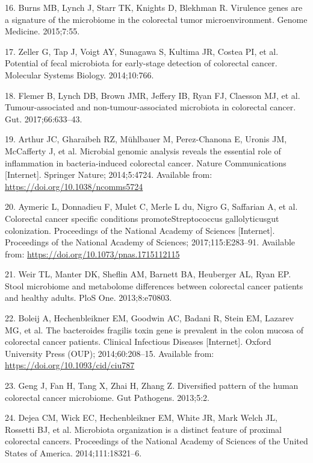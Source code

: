 \documentclass[12pt,]{article}
\begin{document}
\hypertarget{ref-burns_virulence_2015}{}
16. Burns MB, Lynch J, Starr TK, Knights D, Blekhman R. Virulence genes
are a signature of the microbiome in the colorectal tumor
microenvironment. Genome Medicine. 2015;7:55.

\hypertarget{ref-zeller_potential_2014}{}
17. Zeller G, Tap J, Voigt AY, Sunagawa S, Kultima JR, Costea PI, et al.
Potential of fecal microbiota for early-stage detection of colorectal
cancer. Molecular Systems Biology. 2014;10:766.

\hypertarget{ref-flemer_tumour-associated_2017}{}
18. Flemer B, Lynch DB, Brown JMR, Jeffery IB, Ryan FJ, Claesson MJ, et
al. Tumour-associated and non-tumour-associated microbiota in colorectal
cancer. Gut. 2017;66:633--43.

\hypertarget{ref-ecoli_Arthur_2014}{}
19. Arthur JC, Gharaibeh RZ, Mühlbauer M, Perez-Chanona E, Uronis JM,
McCafferty J, et al. Microbial genomic analysis reveals the essential
role of inflammation in bacteria-induced colorectal cancer. Nature
Communications {[}Internet{]}. Springer Nature; 2014;5:4724. Available
from: \url{https://doi.org/10.1038/ncomms5724}

\hypertarget{ref-strep_Aymeric_2017}{}
20. Aymeric L, Donnadieu F, Mulet C, Merle L du, Nigro G, Saffarian A,
et al. Colorectal cancer specific conditions promoteStreptococcus
gallolyticusgut colonization. Proceedings of the National Academy of
Sciences {[}Internet{]}. Proceedings of the National Academy of
Sciences; 2017;115:E283--91. Available from:
\url{https://doi.org/10.1073/pnas.1715112115}

\hypertarget{ref-weir_stool_2013}{}
21. Weir TL, Manter DK, Sheflin AM, Barnett BA, Heuberger AL, Ryan EP.
Stool microbiome and metabolome differences between colorectal cancer
patients and healthy adults. PloS One. 2013;8:e70803.

\hypertarget{ref-bfrag_Boleij_2014}{}
22. Boleij A, Hechenbleikner EM, Goodwin AC, Badani R, Stein EM, Lazarev
MG, et al. The bacteroides fragilis toxin gene is prevalent in the colon
mucosa of colorectal cancer patients. Clinical Infectious Diseases
{[}Internet{]}. Oxford University Press (OUP); 2014;60:208--15.
Available from: \url{https://doi.org/10.1093/cid/ciu787}

\hypertarget{ref-geng_diversified_2013}{}
23. Geng J, Fan H, Tang X, Zhai H, Zhang Z. Diversified pattern of the
human colorectal cancer microbiome. Gut Pathogens. 2013;5:2.

\hypertarget{ref-dejea_microbiota_2014}{}
24. Dejea CM, Wick EC, Hechenbleikner EM, White JR, Mark Welch JL,
Rossetti BJ, et al. Microbiota organization is a distinct feature of
proximal colorectal cancers. Proceedings of the National Academy of
Sciences of the United States of America. 2014;111:18321--6.
\end{document}
